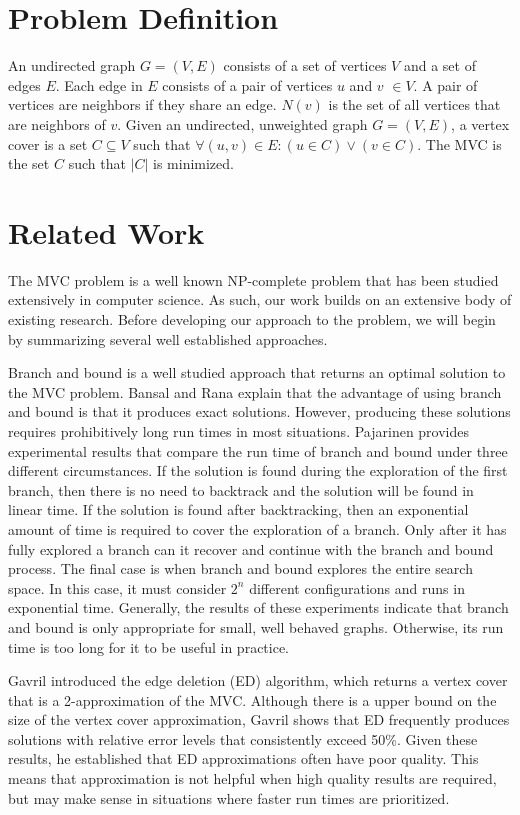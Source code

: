 \documentclass{sig-alternate-05-2015}
\begin{document}
\section{Problem Definition}
An undirected graph $G=(V,E)$ consists of a set of vertices $V$ and a set of edges $E$. Each edge in $E$ consists of a pair of vertices $u$ and $v$ $\in V$. A pair of vertices are neighbors if they share an edge. $N(v)$ is the set of all vertices that are neighbors of $v$.
	Given an undirected, unweighted graph $G=(V,E)$, a vertex cover is a set $C \subseteq V$ such that $\forall (u,v) \in E : (u \in C) \vee (v \in C)$. The MVC is the set $C$ such that $|C|$ is minimized.

\section{Related Work}
The MVC problem is a well known NP-complete problem that has been studied extensively in computer science. As such, our work builds on an extensive body of existing research. Before developing our approach to the problem, we will begin by summarizing several well established approaches.
\par
Branch and bound is a well studied approach that returns an optimal solution to the MVC problem. Bansal and Rana explain that the advantage of using branch and bound is that it produces exact solutions. However, producing these solutions requires prohibitively long run times in most situations. Pajarinen provides experimental results that compare the run time of branch and bound under three different circumstances.  If the solution is found during the exploration of the first branch, then there is no need to backtrack and the solution will be found in linear time.  If the solution is found after backtracking, then an exponential amount of time is required to cover the exploration of a branch. Only after it has fully explored a branch can it recover and continue with the branch and bound process.  The final case is when branch and bound explores the entire search space. In this case, it must consider $2^n$ different configurations and runs in exponential time. Generally, the results of these experiments indicate that branch and bound is only appropriate for small, well behaved graphs. Otherwise, its run time is too long for it to be useful in practice.
\par
Gavril introduced the edge deletion (ED) algorithm, which returns a vertex cover that is a 2-approximation of the MVC.  Although there is a upper bound on the size of the vertex cover approximation, Gavril shows that ED frequently produces solutions with relative error levels that consistently exceed 50\%. Given these results, he established that ED approximations often have poor quality. This means that approximation is not helpful when high quality results are required, but may make sense in situations where faster run times are prioritized.
\end{document}
